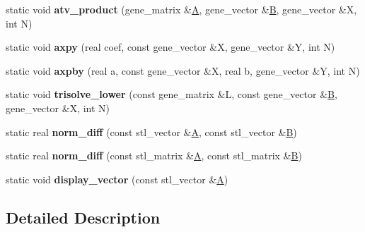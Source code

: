 \begin{DoxyCompactItemize}
static void {\bfseries atv\+\_\+product} (gene\+\_\+matrix \&\hyperlink{group___core___module_class_eigen_1_1_matrix}{A}, gene\+\_\+vector \&\hyperlink{group___core___module_class_eigen_1_1_matrix}{B}, gene\+\_\+vector \&X, int N)
\item 
\mbox{\label{class_s_t_l__interface_a030f479aada0f19121fbb78bbd8e5ece}} 
static void {\bfseries axpy} (real coef, const gene\+\_\+vector \&X, gene\+\_\+vector \&Y, int N)
\item 
\mbox{\label{class_s_t_l__interface_a952aa772e33d8d3f0517b57bd59bb6ab}} 
static void {\bfseries axpby} (real a, const gene\+\_\+vector \&X, real b, gene\+\_\+vector \&Y, int N)
\item 
\mbox{\label{class_s_t_l__interface_a37c93e4cdf74080795a47180894f53bb}} 
static void {\bfseries trisolve\+\_\+lower} (const gene\+\_\+matrix \&L, const gene\+\_\+vector \&\hyperlink{group___core___module_class_eigen_1_1_matrix}{B}, gene\+\_\+vector \&X, int N)
\item 
\mbox{\label{class_s_t_l__interface_ae22df884fd2657f82119665d11ba07e4}} 
static real {\bfseries norm\+\_\+diff} (const stl\+\_\+vector \&\hyperlink{group___core___module_class_eigen_1_1_matrix}{A}, const stl\+\_\+vector \&\hyperlink{group___core___module_class_eigen_1_1_matrix}{B})
\item 
\mbox{\label{class_s_t_l__interface_a50dcee48c1ae9dbfe67fc7bfb816a394}} 
static real {\bfseries norm\+\_\+diff} (const stl\+\_\+matrix \&\hyperlink{group___core___module_class_eigen_1_1_matrix}{A}, const stl\+\_\+matrix \&\hyperlink{group___core___module_class_eigen_1_1_matrix}{B})
\item 
\mbox{\label{class_s_t_l__interface_a60aad273027a15a9df65a512cc9b0527}} 
static void {\bfseries display\+\_\+vector} (const stl\+\_\+vector \&\hyperlink{group___core___module_class_eigen_1_1_matrix}{A})
\end{DoxyCompactItemize}


\subsection{Detailed Description}
